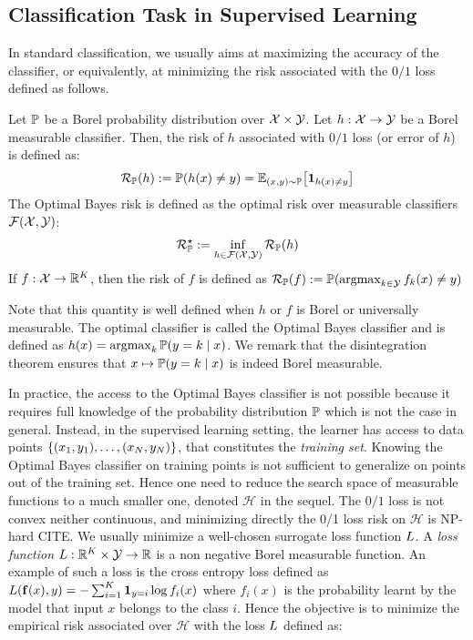 \subsection{Classification Task in Supervised Learning}


In standard classification, we usually aims at maximizing the accuracy of the classifier, or equivalently, at minimizing the risk associated with the $0/1$ loss defined as follows.

    
\begin{definition} Let $\mathbb{P}$ be a Borel probability distribution over $\mathcal{X}\times\mathcal{Y}$. Let $h:\mathcal{X}\to\mathcal{Y}$ be a Borel measurable classifier. Then, the risk of $h$ associated with $0/1$ loss (or error of $h$) is defined as:
\begin{align}
   \risk_{\PP}(h):=\PP(h(x)\neq y) = \EE_{(x,y)\sim\PP}\left[\mathbf{1}_{h(x)\neq y}\right]
\end{align}
The Optimal Bayes risk is defined as the optimal risk over measurable classifiers $\mathcal{F}(\mathcal{X},\mathcal{Y})$:
\begin{align}
    \mathcal{R}^\star_{\mathbb{P}}:=\inf_{h\in\mathcal{F}(\mathcal{X},\mathcal{Y})}\mathcal{R}_{\mathbb{P}}(h)
 \end{align}
If $f:\mathcal{X}\to\mathbb{R}^K$, then the risk of $f$ is defined as $\mathcal{R}_{\mathbb{P}}(f):=\mathbb{P}(\operatorname*{argmax}_{k\in\mathcal{Y}}f_k(x)\neq y)$
\end{definition}

Note that this quantity is well defined when $h$ or $f$ is Borel or universally measurable. The optimal classifier is called the Optimal Bayes  classifier and is defined as $h(x) = \operatorname*{argmax}_k\mathbb{P}(y=k\mid x)$. We remark that the disintegration theorem ensures that $x\mapsto \mathbb{P}(y=k\mid x)$ is indeed Borel measurable. 

In practice, the access to the Optimal Bayes  classifier is not possible because it requires full knowledge of the probability distribution $\mathbb{P}$ which is not the case in general. Instead, in the supervised learning setting, the learner has access to data points $\{(x_1,y_1),\dots,(x_N,y_N)\}$, that constitutes the \emph{training set}. Knowing the Optimal Bayes classifier on training points is not sufficient to generalize on points out of the training set. Hence one need to reduce the search space of measurable functions to a much smaller one, denoted $\mathcal{H}$ in the sequel. The $0/1$ loss is not convex neither continuous, and minimizing directly the 0/1 loss risk  on $\mathcal{H}$ is  NP-hard CITE. We usually minimize a well-chosen surrogate loss function $L$. A \textit{loss function} $L:\mathbb{R}^K\times\mathcal{Y}\to\mathbb{R}$ is a non negative Borel measurable function. An example of such a loss is the cross entropy loss defined as $L(\mathbf{f}(x),y)=-\sum_{i=1}^K \mathbf{1}_{y=i}\log f_i(x)$
where $f_i(x)$ is the probability learnt by the model that input $x$ belongs to the class $i$. Hence the objective is to minimize the empirical risk associated over $\mathcal{H}$ with the loss $L$  defined as:

